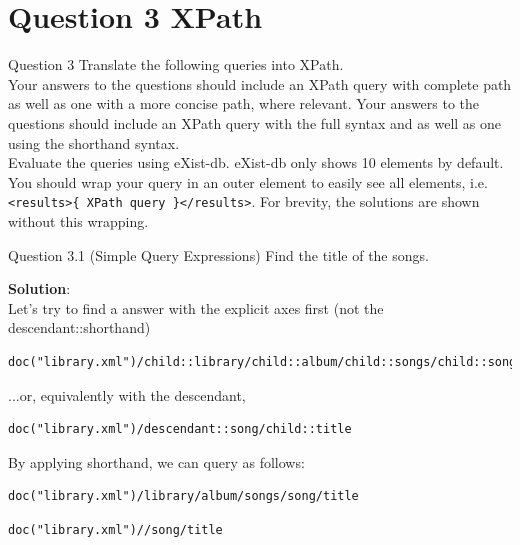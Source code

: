\section*{Question 3 XPath}

\begin{frame}[fragile]{Question 3}
Translate the following queries into XPath.\\\vspace{5pt}
Your answers to the questions should include an XPath query with complete path as well as one with a more concise
path, where relevant. Your answers to the questions should include an XPath query with the full syntax and as
well as one using the shorthand syntax.\\\vspace{5pt}
Evaluate the queries using eXist-db. eXist-db only shows 10 elements by default. You should wrap your query in
an outer element to easily see all elements, i.e. \texttt{<results>\{ XPath query \}</results>}. For brevity, the solutions
are shown without this wrapping.\\\vspace{5pt}
\end{frame}

\begin{frame}[fragile]{Question 3.1 (Simple Query Expressions)}
Find the title of the songs.\\ \vspace{5pt}

\textbf{Solution}: \\
Let's try to find a answer with the explicit axes first (not the descendant::shorthand)
\begin{lstlisting}[style=xml-small-nomargin]
doc("library.xml")/child::library/child::album/child::songs/child::song/child::title
\end{lstlisting}\vspace{5pt}
...or, equivalently with the descendant,
\begin{lstlisting}[style=xml-small-nomargin]
doc("library.xml")/descendant::song/child::title
\end{lstlisting}\vspace{5pt}

By applying shorthand, we can query as follows:
\begin{lstlisting}[style=xml-small-nomargin]
doc("library.xml")/library/album/songs/song/title
\end{lstlisting}

\begin{lstlisting}[style=xml-small-nomargin]
doc("library.xml")//song/title
\end{lstlisting}\vspace{5pt}
\end{frame}


